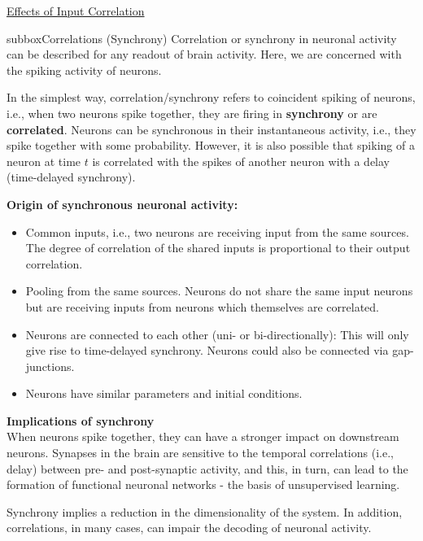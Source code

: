 \begin{textbox}{\href{https://compneuro.neuromatch.io/tutorials/W1D4_GeneralizedLinearModels/student/W1D4_Tutorial1.html}{Effects of Input Correlation } }
\begin{subbox}{subbox}{Correlations (Synchrony)}
\scriptsize
Correlation or synchrony in neuronal activity can be described for any readout of brain activity. Here, we are concerned with the spiking activity of neurons. 

In the simplest way, correlation/synchrony refers to coincident spiking of neurons, i.e., when two neurons spike together, they are firing in \textbf{synchrony} or are \textbf{correlated}. Neurons can be synchronous in their instantaneous activity, i.e., they spike together with some probability. However, it is also possible that spiking of a neuron at time $t$ is correlated with the spikes of another neuron with a delay (time-delayed synchrony). 

\textbf{Origin of synchronous neuronal activity:}
\begin{itemize}
    \item 
 Common inputs, i.e., two neurons are receiving input from the same sources. The degree of correlation of the shared inputs is proportional to their output correlation.
 \item  Pooling from the same sources. Neurons do not share the same input neurons but are receiving inputs from neurons which themselves are correlated.
 \item  Neurons are connected to each other (uni- or bi-directionally): This will only give rise to time-delayed synchrony. Neurons could also be connected via gap-junctions.
 \item Neurons have similar parameters and initial conditions.
\end{itemize}

\textbf{Implications of synchrony}\\
When neurons spike together, they can have a stronger impact on downstream neurons. Synapses in the brain are sensitive to the temporal correlations (i.e., delay) between pre- and post-synaptic activity, and this, in turn, can lead to the formation of functional neuronal networks - the basis of unsupervised learning.

Synchrony implies a reduction in the dimensionality of the system. In addition, correlations, in many cases, can impair the decoding of neuronal activity.


\end{subbox}
\end{textbox}
